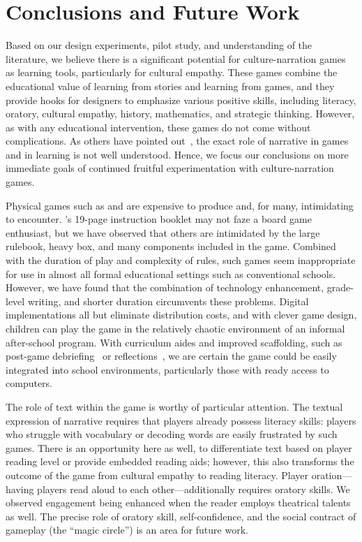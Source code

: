 \documentclass[a4paper]{article}
\begin{document}
\section{Conclusions and Future Work}

Based on our design experiments, pilot study, and understanding of the
literature, we believe there is a significant potential for
culture-narration games as learning tools, particularly for
cultural empathy.
These games combine the educational value of learning from stories
and learning from games, and they provide hooks for designers to 
emphasize various positive skills, including literacy, 
oratory, cultural empathy, history, mathematics, and strategic thinking.
However, as with any educational intervention, these games do not
come without complications.
As others have pointed out~\citep[\textit{e.g.}]{Slota2015}, 
the exact role of narrative in games and in learning is not well
understood. Hence, we focus our conclusions on more immediate
goals of continued fruitful experimentation with culture-narration games.

Physical games such as \totan{} and \smersh{} are expensive to produce
and, for many, intimidating to encounter. \totan{}'s 19-page
instruction booklet may not faze a board game enthusiast, but we have
observed that others are intimidated by the large rulebook, heavy box,
and many components included in the game. Combined with the duration
of play and complexity of rules, such games seem inappropriate for use
in almost all formal educational settings such as conventional
schools.  However, we have found that the combination of technology
enhancement, grade-level writing, and shorter duration circumvents
these problems.  Digital implementations all but eliminate
distribution costs, and with clever game design, children can play the
game in the relatively chaotic environment of an informal after-school
program. With curriculum aides and improved scaffolding, such as
post-game debriefing~\citep{Nicholson2012}
or reflections~\citep{Hickey2013},
we are certain the game could be easily
integrated into school environments, particularly those with
ready access to computers.

The role of text within the game is worthy of particular attention.
The textual expression of narrative requires that players already possess
literacy skills: players who struggle with vocabulary or decoding words
are easily frustrated by such games. There is an opportunity
here as well, to differentiate text based on player reading level
or provide embedded reading aids; however, this also transforms
the outcome of the game from cultural empathy to reading literacy.
Player oration---having players read aloud to each
other---additionally requires oratory skills. We observed engagement
being enhanced when the reader employs theatrical talents as well.
The precise role of oratory skill, self-confidence, and the social
contract of gameplay (the ``magic circle'') is an area for future work.
\end{document}
